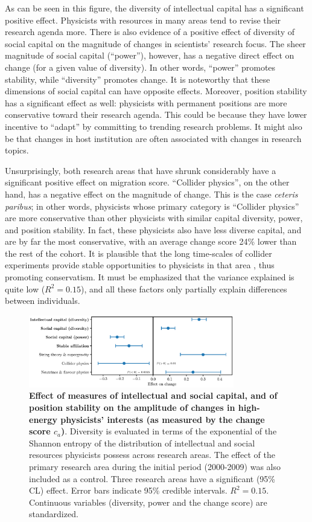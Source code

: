 \documentclass{article}
\begin{document}
As can be seen in this figure, the diversity of intellectual capital has a significant positive effect. Physicists with resources in many areas tend to revise their research agenda more. There is also evidence of a positive effect of diversity of social capital on the magnitude of changes in scientists' research focus. The sheer magnitude of social capital (``power''), however, has a negative direct effect on change (for a given value of diversity). In other words, ``power'' promotes stability, while ``diversity'' promotes change. It is noteworthy that these dimensions of social capital can have opposite effects. Moreover, position stability has a significant effect as well: physicists with permanent positions are more conservative toward their research agenda. This could be because they have lower incentive to ``adapt'' by committing to trending research problems. It might also be that changes in host institution are often associated with changes in research topics.

Unsurprisingly, both research areas that have shrunk considerably have a significant positive effect on migration score. ``Collider physics'', on the other hand, has a negative effect on the magnitude of change. This is the case \textit{ceteris paribus}; in other words, physicists whose primary category is ``Collider physics'' are more conservative than other physicists with similar capital diversity, power, and position stability. In fact, these physicists also have less diverse capital, and are by far the most conservative, with an average change score 24\% lower than the rest of the cohort. It is plausible that the long time-scales of collider experiments provide stable opportunities to physicists in that area \citep[p.~138]{galison1987how}, thus promoting conservatism. It must be emphasized that the variance explained is quite low ($R^2=0.15$), and all these factors only partially explain differences between individuals.

\begin{figure}[h]
    \centering
    \includegraphics[width=0.8\textwidth]{plots/change_score_effects_entropy_magnitude.eps}
    \caption{\textbf{Effect of measures of intellectual and social capital, and of position stability on the amplitude of changes in high-energy physicists' interests (as measured by the change score $c_a$)}. Diversity is evaluated in terms of the exponential of the Shannon entropy of the distribution of intellectual and social resources physicists possess across research areas. The effect of the primary research area during the initial period (2000-2009) was also included as a control. Three research areas have a significant (95\% CL) effect. Error bars indicate 95\% credible intervals. $R^2=0.15$. Continuous variables (diversity, power and the change score) are standardized.}
    \label{fig:change_score_effect}
\end{figure}
\end{document}
